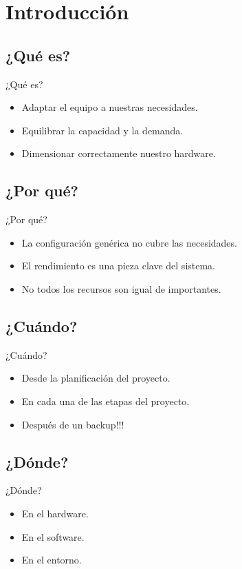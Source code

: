 \section{Introducción}
\subsection{¿Qué es?}
\begin{frame}{¿Qué es?}
	\begin{itemize}
		\item Adaptar el equipo a nuestras necesidades.
		\item Equilibrar la capacidad y la demanda.
		\item Dimensionar correctamente nuestro hardware.
	\end{itemize}
\end{frame}

\subsection{¿Por qué?}
\begin{frame}{¿Por qué?}
	\begin{itemize}
		\item La configuración genérica no cubre las necesidades.
		\item El rendimiento es una pieza clave del sistema.
		\item No todos los recursos son igual de importantes.
	\end{itemize}
\end{frame}

\subsection{¿Cuándo?}
\begin{frame}{¿Cuándo?}
	\begin{itemize}
		\item Desde la planificación del proyecto.
		\item En cada una de las etapas del proyecto.
		\item Después de un backup!!!
	\end{itemize}
\end{frame}

\subsection{¿Dónde?}
\begin{frame}{¿Dónde?}
	\begin{itemize}
		\item En el hardware.
		\item En el software.
		\item En el entorno.
	\end{itemize}
\end{frame}

